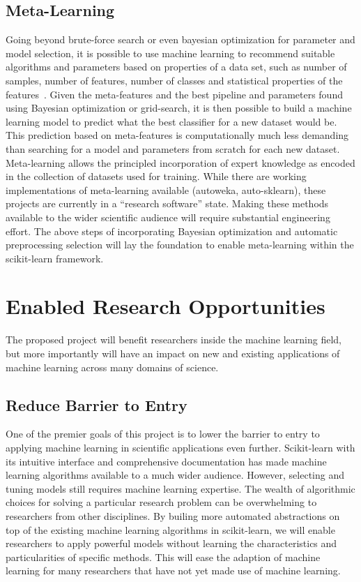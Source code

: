 \subsection{Meta-Learning}
Going beyond brute-force search or even bayesian optimization for parameter and
model selection, it is possible to use machine learning to recommend suitable
algorithms and parameters based on properties of a data set, such as number of
samples, number of features, number of classes and statistical properties of
the features~\cite{luo2015review, feurer-nips2015}.
Given the meta-features and the best pipeline and parameters found using
Bayesian optimization or grid-search, it is then possible to build a machine
learning model to predict what the best classifier for a new dataset would be.
This prediction based on meta-features is computationally much less demanding
than searching for a model and parameters from scratch for each new dataset.
Meta-learning allows the principled incorporation of expert knowledge as encoded
in the collection of datasets used for training.
While there are working implementations of meta-learning available (autoweka, auto-sklearn),
these projects are currently in a ``research software'' state. Making these methods
available to the wider scientific audience will require substantial engineering
effort. The above steps of incorporating Bayesian optimization and automatic
preprocessing selection will lay the foundation to enable meta-learning within the
scikit-learn framework.

\section{Enabled Research Opportunities}
The proposed project will benefit researchers inside the machine learning field,
but more importantly will have an impact on new and existing applications of machine
learning across many domains of science.

\subsection{Reduce Barrier to Entry}
One of the premier goals of this project is to lower the barrier to entry
to applying machine learning in scientific applications even further.
Scikit-learn with its intuitive interface and comprehensive documentation
has made machine learning algorithms available to a much wider audience.
However, selecting and tuning models still requires machine learning expertise.
The wealth of algorithmic choices for solving a particular research problem can be
overwhelming to researchers from other disciplines. By builing more automated
abstractions on top of the existing machine learning algorithms in scikit-learn,
we will enable researchers to apply powerful models without learning
the characteristics and particularities of specific methods.
This will ease the adaption of machine learning for many researchers
that have not yet made use of machine learning.

